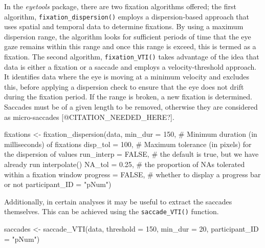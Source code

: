 \documentclass[
  man,
  floatsintext,
  longtable,
  nolmodern,
  notxfonts,
  notimes,
  colorlinks=true,linkcolor=blue,citecolor=blue,urlcolor=blue]{apa7}
\newenvironment{Shaded}{\begin{snugshade}}{\end{snugshade}}
\newcommand{\AttributeTok}[1]{\textcolor[rgb]{0.40,0.45,0.13}{#1}}
\newcommand{\CommentTok}[1]{\textcolor[rgb]{0.37,0.37,0.37}{#1}}
\newcommand{\ConstantTok}[1]{\textcolor[rgb]{0.56,0.35,0.01}{#1}}
\newcommand{\DecValTok}[1]{\textcolor[rgb]{0.68,0.00,0.00}{#1}}
\newcommand{\FloatTok}[1]{\textcolor[rgb]{0.68,0.00,0.00}{#1}}
\newcommand{\FunctionTok}[1]{\textcolor[rgb]{0.28,0.35,0.67}{#1}}
\newcommand{\NormalTok}[1]{\textcolor[rgb]{0.00,0.23,0.31}{#1}}
\newcommand{\OtherTok}[1]{\textcolor[rgb]{0.00,0.23,0.31}{#1}}
\newcommand{\StringTok}[1]{\textcolor[rgb]{0.13,0.47,0.30}{#1}}
\begin{document}
In the \emph{eyetools} package, there are two fixation algorithms
offered; the first algorithm, \texttt{fixation\_dispersion()} employs a
dispersion-based approach that uses spatial and temporal data to
determine fixations. By using a maximum dispersion range, the algorithm
looks for sufficient periods of time that the eye gaze remains within
this range and once this range is exceed, this is termed as a fixation.
The second algorithm, \texttt{fixation\_VTI()} takes advantage of the
idea that data is either a fixation or a saccade and employs a
velocity-threshold approach. It identifies data where the eye is moving
at a minimum velocity and excludes this, before applying a dispersion
check to ensure that the eye does not drift during the fixation period.
If the range is broken, a new fixation is determined. Saccades must be
of a given length to be removed, otherwise they are considered as
micro-saccades {[}@CITATION\_NEEDED\_HERE?{]}.

\begin{Shaded}
\begin{Highlighting}[]
\NormalTok{fixations }\OtherTok{\textless{}{-}} \FunctionTok{fixation\_dispersion}\NormalTok{(data,}
                                 \AttributeTok{min\_dur =} \DecValTok{150}\NormalTok{, }\CommentTok{\# Minimum duration (in milliseconds) of fixations}
                                 \AttributeTok{disp\_tol =} \DecValTok{100}\NormalTok{, }\CommentTok{\# Maximum tolerance (in pixels) for the dispersion of values}
                                 \AttributeTok{run\_interp =} \ConstantTok{FALSE}\NormalTok{, }\CommentTok{\# the default is true, but we have already run interpolate()}
                                 \AttributeTok{NA\_tol =} \FloatTok{0.25}\NormalTok{, }\CommentTok{\# the proportion of NAs tolerated within a fixation window}
                                 \AttributeTok{progress =} \ConstantTok{FALSE}\NormalTok{, }\CommentTok{\# whether to display a progress bar or not}
                                 \AttributeTok{participant\_ID =} \StringTok{"pNum"}\NormalTok{) }
\end{Highlighting}
\end{Shaded}

Additionally, in certain analyses it may be useful to extract the
saccades themselves. This can be achieved using the
\texttt{saccade\_VTI()} function.

\begin{Shaded}
\begin{Highlighting}[]
\NormalTok{saccades }\OtherTok{\textless{}{-}} \FunctionTok{saccade\_VTI}\NormalTok{(data, }
                        \AttributeTok{threshold =} \DecValTok{150}\NormalTok{, }
                        \AttributeTok{min\_dur =} \DecValTok{20}\NormalTok{, }
                        \AttributeTok{participant\_ID =} \StringTok{"pNum"}\NormalTok{)}
\end{Highlighting}
\end{Shaded}
\end{document}
